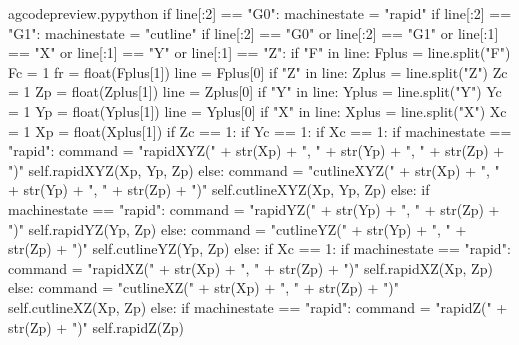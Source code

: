 \documentclass{ltxdoc}
\begin{document}
\lstset{firstnumber=\thegcpy}
\begin{writecode}{a}{gcodepreview.py}{python}
            if line[:2] == "G0":
                machinestate = "rapid"
            if line[:2] == "G1":
                machinestate = "cutline"
            if line[:2] == "G0" or line[:2] == "G1" or line[:1] == "X" or line[:1] == "Y" or line[:1] == "Z":
                if "F" in line:
                    Fplus = line.split("F")
                    Fc = 1
                    fr = float(Fplus[1])
                    line = Fplus[0]
                if "Z" in line:
                    Zplus = line.split("Z")
                    Zc = 1
                    Zp = float(Zplus[1])
                    line = Zplus[0]
                if "Y" in line:
                    Yplus = line.split("Y")
                    Yc = 1
                    Yp = float(Yplus[1])
                    line = Yplus[0]
                if "X" in line:
                    Xplus = line.split("X")
                    Xc = 1
                    Xp = float(Xplus[1])
                if Zc == 1:
                    if Yc == 1:
                        if Xc == 1:
                            if machinestate == "rapid":
                                command = "rapidXYZ(" + str(Xp) + ", " + str(Yp) + ", " + str(Zp) + ")"
                                self.rapidXYZ(Xp, Yp, Zp)
                            else: 
                                command = "cutlineXYZ(" + str(Xp) + ", " + str(Yp) + ", " + str(Zp) + ")"
                                self.cutlineXYZ(Xp, Yp, Zp)
                        else:
                            if machinestate == "rapid":
                                command = "rapidYZ(" + str(Yp) + ", " + str(Zp) + ")"
                                self.rapidYZ(Yp, Zp)
                            else: 
                                command = "cutlineYZ(" + str(Yp) + ", " + str(Zp) + ")"
                                self.cutlineYZ(Yp, Zp)
                    else:
                        if Xc == 1:
                            if machinestate == "rapid":
                                command = "rapidXZ(" + str(Xp) + ", " + str(Zp) + ")"
                                self.rapidXZ(Xp, Zp)
                            else: 
                                command = "cutlineXZ(" + str(Xp) + ", " + str(Zp) + ")"
                                self.cutlineXZ(Xp, Zp)
                        else:
                            if machinestate == "rapid":
                                command = "rapidZ(" + str(Zp) + ")"
                                self.rapidZ(Zp)

\end{writecode}
\end{document}
